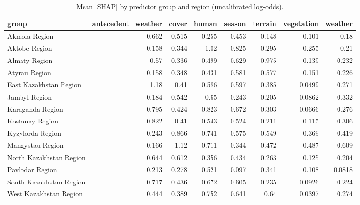 \begin{table}
\caption{Mean |SHAP| by predictor group and region (uncalibrated log-odds).}
\label{tab:T13_shap_groups_region}
\begin{tabular}{lrrrrrrr}
\toprule
group & antecedent_weather & cover & human & season & terrain & vegetation & weather \\
\midrule
Akmola Region & 0.662 & 0.515 & 0.255 & 0.453 & 0.148 & 0.101 & 0.18 \\
Aktobe Region & 0.158 & 0.344 & 1.02 & 0.825 & 0.295 & 0.255 & 0.21 \\
Almaty Region & 0.57 & 0.336 & 0.499 & 0.629 & 0.975 & 0.139 & 0.232 \\
Atyrau Region & 0.158 & 0.348 & 0.431 & 0.581 & 0.577 & 0.151 & 0.226 \\
East Kazakhstan Region & 1.18 & 0.41 & 0.586 & 0.597 & 0.385 & 0.0499 & 0.271 \\
Jambyl Region & 0.184 & 0.542 & 0.65 & 0.243 & 0.205 & 0.0862 & 0.332 \\
Karaganda Region & 0.795 & 0.424 & 0.823 & 0.672 & 0.303 & 0.0666 & 0.276 \\
Kostanay Region & 0.822 & 0.41 & 0.543 & 0.524 & 0.211 & 0.115 & 0.306 \\
Kyzylorda Region & 0.243 & 0.866 & 0.741 & 0.575 & 0.549 & 0.369 & 0.419 \\
Mangystau Region & 0.166 & 1.12 & 0.711 & 0.344 & 0.472 & 0.487 & 0.609 \\
North Kazakhstan Region & 0.644 & 0.612 & 0.356 & 0.434 & 0.263 & 0.125 & 0.204 \\
Pavlodar Region & 0.213 & 0.278 & 0.521 & 0.097 & 0.341 & 0.108 & 0.0818 \\
South Kazakhstan Region & 0.717 & 0.436 & 0.672 & 0.605 & 0.235 & 0.0926 & 0.224 \\
West Kazakhstan Region & 0.444 & 0.389 & 0.752 & 0.641 & 0.64 & 0.0397 & 0.274 \\
\bottomrule
\end{tabular}
\end{table}
